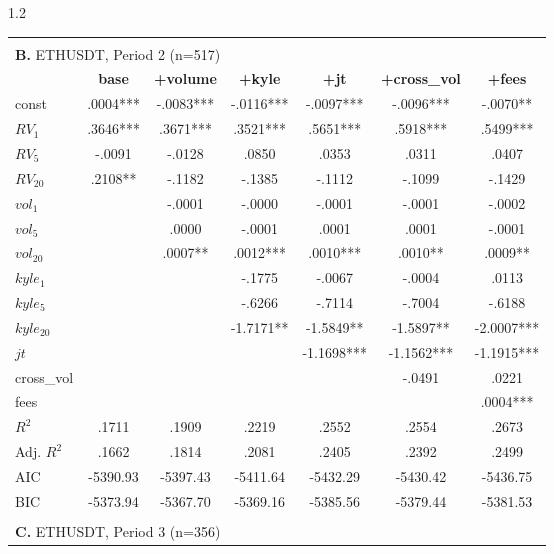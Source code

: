 \documentclass[10pt]{article}
\begin{document}
\begin{setstretch}{1.2}
\begin{small}
\begin{longtable}{l*{6}{c}}
\hline
\\[2pt]
\multicolumn{7}{l}{\textbf{B.} ETHUSDT, Period 2 (n=517)} \\
& \textbf{base} & \textbf{+volume} & \textbf{+kyle} & \textbf{+jt} & \textbf{+cross\_vol} & \textbf{+fees} \\
\hline
const & \hfil .0004*** & \hfil -.0083*** & \hfil -.0116*** & \hfil -.0097*** & \hfil -.0096*** & \hfil -.0070** \\
$RV_1$ & \hfil .3646*** & \hfil .3671*** & \hfil .3521*** & \hfil .5651*** & \hfil .5918*** & \hfil .5499*** \\
$RV_5$ & \hfil -.0091 & \hfil -.0128 & \hfil .0850 & \hfil .0353 & \hfil .0311 & \hfil .0407 \\
$RV_{20}$ & \hfil .2108** & \hfil -.1182 & \hfil -.1385 & \hfil -.1112 & \hfil -.1099 & \hfil -.1429 \\
$vol_1$ & & \hfil -.0001 & \hfil -.0000 & \hfil -.0001 & \hfil -.0001 & \hfil -.0002 \\
$vol_5$ & & \hfil .0000 & \hfil -.0001 & \hfil .0001 & \hfil .0001 & \hfil -.0001 \\
$vol_{20}$ & & \hfil .0007** & \hfil .0012*** & \hfil .0010*** & \hfil .0010** & \hfil .0009** \\
$kyle_1$ & & & \hfil -.1775 & \hfil -.0067 & \hfil -.0004 & \hfil .0113 \\
$kyle_5$ & & & \hfil -.6266 & \hfil -.7114 & \hfil -.7004 & \hfil -.6188 \\
$kyle_{20}$ & & & \hfil -1.7171** & \hfil -1.5849** & \hfil -1.5897** & \hfil -2.0007*** \\
$jt$ & & & & \hfil -1.1698*** & \hfil -1.1562*** & \hfil -1.1915*** \\
cross\_vol & & & & & \hfil -.0491 & \hfil .0221 \\
fees & & & & & & \hfil .0004*** \\
\hline
$R^2$ & \hfil .1711 & \hfil .1909 & \hfil .2219 & \hfil .2552 & \hfil .2554 & \hfil .2673 \\
Adj. $R^2$ & \hfil .1662 & \hfil .1814 & \hfil .2081 & \hfil .2405 & \hfil .2392 & \hfil .2499 \\
AIC & \hfil -5390.93 & \hfil -5397.43 & \hfil -5411.64 & \hfil -5432.29 & \hfil -5430.42 & \hfil -5436.75 \\
BIC & \hfil -5373.94 & \hfil -5367.70 & \hfil -5369.16 & \hfil -5385.56 & \hfil -5379.44 & \hfil -5381.53 \\
\hline
\\[2pt]
\multicolumn{7}{l}{\textbf{C.} ETHUSDT, Period 3 (n=356)} \\

\end{longtable}
\end{small}
\end{setstretch}
\end{document}
